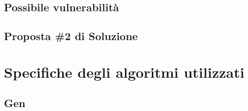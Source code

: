         \subsection{Possibile vulnerabilità}

        \subsection{Proposta \#2 di Soluzione}


    \section{Specifiche degli algoritmi utilizzati}

        \subsection{Gen}
